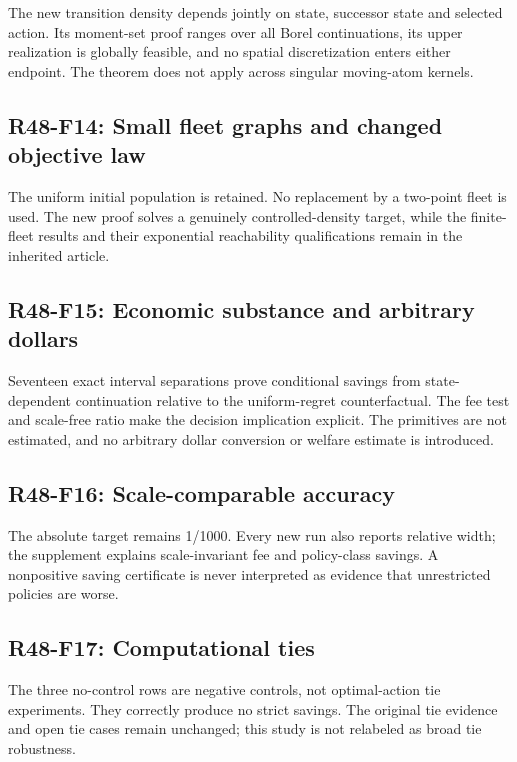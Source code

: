 The new transition density depends jointly on state, successor state and selected action. Its moment-set proof ranges over all Borel continuations, its upper realization is globally feasible, and no spatial discretization enters either endpoint. The theorem does not apply across singular moving-atom kernels.

\subsection{R48-F14: Small fleet graphs and changed objective law}

The uniform initial population is retained. No replacement by a two-point fleet is used. The new proof solves a genuinely controlled-density target, while the finite-fleet results and their exponential reachability qualifications remain in the inherited article.

\subsection{R48-F15: Economic substance and arbitrary dollars}

Seventeen exact interval separations prove conditional savings from state-dependent continuation relative to the uniform-regret counterfactual. The fee test and scale-free ratio make the decision implication explicit. The primitives are not estimated, and no arbitrary dollar conversion or welfare estimate is introduced.

\subsection{R48-F16: Scale-comparable accuracy}

The absolute target remains 1/1000. Every new run also reports relative width; the supplement explains scale-invariant fee and policy-class savings. A nonpositive saving certificate is never interpreted as evidence that unrestricted policies are worse.

\subsection{R48-F17: Computational ties}

The three no-control rows are negative controls, not optimal-action tie experiments. They correctly produce no strict savings. The original tie evidence and open tie cases remain unchanged; this study is not relabeled as broad tie robustness.

